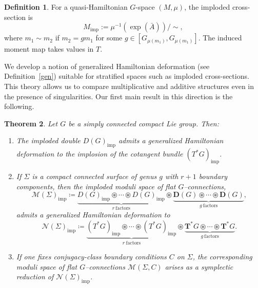 \documentclass[reqno]{amsart}
\theoremstyle{plain}
\newtheorem{Thm}{Theorem}[section]
\theoremstyle{definition}
\newtheorem{Def}[Thm]{Definition}
\newcommand{\M}{\mathcal{M}}
\begin{document}
\begin{Def}\cite[Definition~3.2]{hurtubise2006group}
For a quasi-Hamiltonian $G$-space $(M,\mu)$, the imploded cross-section is
\[
M_{\mathrm{imp}}:=\mu^{-1}(\exp(\bar{A}))/\!\sim,
\]
where $m_1\sim m_2$ if $m_2=g m_1$ for some $g\in [G_{\mu(m_1)},G_{\mu(m_1)}]$. The induced moment map takes values in $T$.
\end{Def}

We develop a notion of generalized Hamiltonian deformation (see Definition~\ref{gen}) suitable for stratified spaces such as imploded cross-sections. This theory allows us to compare multiplicative and additive structures even in the presence of singularities. Our first main result in this direction is the following.


\begin{Thm}\label{Thm 1.6}
Let $G$ be a simply connected compact Lie group. Then:
\begin{enumerate}
\item The imploded double $D(G)_{\mathrm{imp}}$ admits a generalized Hamiltonian deformation to the implosion of the cotangent bundle $(T^{*}G)_{\mathrm{imp}}$.
\item If $\Sigma$ is a compact connected surface of genus $g$ with $r+1$ boundary components, then the imploded moduli space of flat $G$--connections,
\[
\mathcal{M}(\Sigma)_{\mathrm{imp}}
\coloneqq
\underbrace{D(G)_{\mathrm{imp}}\circledast\cdots\circledast D(G)_{\mathrm{imp}}}_{r\ \text{factors}}
\circledast
\underbrace{\mathbf{D}(G)\circledast\cdots\circledast \mathbf{D}(G)}_{g\ \text{factors}},
\]
admits a generalized Hamiltonian deformation to
\[
\mathcal{N}(\Sigma)_{\mathrm{imp}}
\coloneqq
\underbrace{(T^{*}G)_{\mathrm{imp}}\circledast\cdots\circledast (T^{*}G)_{\mathrm{imp}}}_{r\ \text{factors}}
\circledast
\underbrace{\mathbf{T}^{*}G\circledast\cdots\circledast \mathbf{T}^{*}G}_{g\ \text{factors}}.
\]
\item If one fixes conjugacy-class boundary conditions $C$ on $\Sigma$, the corresponding moduli space of flat $G$--connections $\M(\Sigma,C)$ arises as a symplectic reduction of $\mathcal{N}(\Sigma)_{\mathrm{imp}}$.
\end{enumerate}
\end{Thm}
\end{document}
